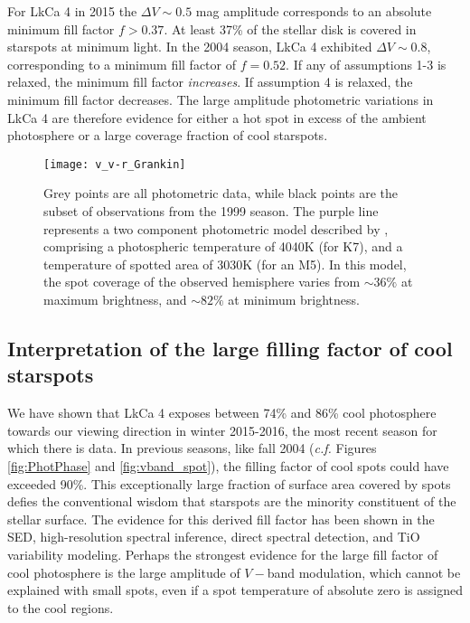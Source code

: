 \documentclass[twocolumn]{emulateapj}%
\begin{document}
For LkCa 4 in 2015 the $\Delta V\sim 0.5$ mag amplitude corresponds to an absolute minimum fill factor $f>0.37$.  At least 37\% of the stellar disk is covered in starspots at minimum light.  In the 2004 season, LkCa 4 exhibited $\Delta V\sim 0.8$, corresponding to a minimum fill factor of $f=0.52$.  If any of assumptions 1-3 is relaxed, the minimum fill factor \emph{increases}.  If assumption 4 is relaxed, the minimum fill factor decreases.  The large amplitude photometric variations in LkCa 4 are therefore evidence for either a hot spot in excess of the ambient photosphere or a large coverage fraction of cool starspots.  


\begin{figure}
 \centering
\texttt{[image: v\_v-r\_Grankin]} 
\caption{Grey points are all \citet{grankin08} photometric data, while black points are the subset of observations from the 1999 season.  The purple line represents a two component photometric model  described by \citet{grankin08}, comprising a photospheric temperature of 4040K (for K7), and a temperature of spotted area of 3030K (for an M5). In this model, the spot coverage of the observed hemisphere varies from $\sim36\%$ at maximum brightness, and $\sim82\%$ at minimum brightness.}
 \label{fig:grankin_vr}
\end{figure}


\subsection{Interpretation of the large filling factor of cool starspots}
We have shown that LkCa 4 exposes between 74\% and 86\% cool photosphere towards our viewing direction in winter 2015-2016, the most recent season for which there is data.  In previous seasons, like fall 2004 (\emph{c.f.} Figures \ref{fig:PhotPhase} and \ref{fig:vband_spot}), the filling factor of cool spots could have exceeded 90\%.  This exceptionally large fraction of surface area covered by spots defies the conventional wisdom that starspots are the minority constituent of the stellar surface.  The evidence for this derived fill factor has been shown in the SED, high-resolution spectral inference, direct spectral detection, and TiO variability modeling.  Perhaps the strongest evidence for the large fill factor of cool photosphere is the large amplitude of $V-$band modulation, which cannot be explained with small spots, even if a spot temperature of absolute zero is assigned to the cool regions.
\end{document}
